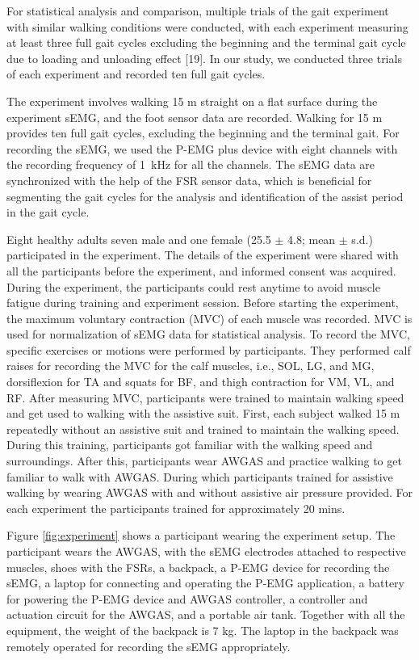 \documentclass[paper,JRM,paper]{jaciiiarticle}
\begin{document}
For statistical analysis and comparison, multiple trials of the gait experiment with similar walking conditions were conducted, with each experiment measuring at least three full gait cycles excluding the beginning and the terminal gait cycle due to loading and unloading effect [19]. In our study, we conducted three trials of each experiment and recorded ten full gait cycles. 

The experiment involves walking 15 m straight on a flat surface during the experiment sEMG, and the foot sensor data are recorded. Walking for 15 m provides ten full gait cycles, excluding the beginning and the terminal gait.  For recording the sEMG, we used the P-EMG plus device with eight channels with the recording frequency of \SI{1}{\kilo\hertz} for all the channels. The sEMG data are synchronized with the help of the FSR sensor data, which is beneficial for segmenting the gait cycles for the analysis and identification of the assist period in the gait cycle. 

Eight healthy adults seven male and one female (25.5 $\pm$ 4.8; mean $\pm$ s.d.) participated in the experiment. The details of the experiment were shared with all the participants before the experiment, and informed consent was acquired. During the experiment, the participants could rest anytime to avoid muscle fatigue during training and experiment session. Before starting the experiment, the maximum voluntary contraction (MVC) of each muscle was recorded. MVC is used for normalization of sEMG data for statistical analysis. To record the MVC, specific exercises or motions were performed by participants. They performed calf raises for recording the MVC for the calf muscles, i.e., SOL, LG, and MG, dorsiflexion for TA and squats for BF, and thigh contraction for VM, VL, and RF. 
After measuring MVC, participants were trained to maintain walking speed and get used to walking with the assistive suit. First, each subject walked 15 m repeatedly without an assistive suit and trained to maintain the walking speed. During this training, participants got familiar with the walking speed and surroundings. After this, participants wear AWGAS and practice walking to get familiar to walk with AWGAS. During which participants trained for assistive walking by wearing AWGAS with and without assistive air pressure provided. For each experiment the participants trained for approximately 20 mins. 



Figure \ref{fig:experiment} shows a participant wearing the experiment setup. The participant wears the AWGAS, with the sEMG electrodes attached to respective muscles, shoes with the FSRs, a backpack, a P-EMG device for recording the sEMG, a laptop for connecting and operating the P-EMG application, a battery for powering the P-EMG device and AWGAS controller, a controller and actuation circuit for the AWGAS, and a portable air tank. Together with all the equipment, the weight of the backpack is 7 kg. The laptop in the backpack was remotely operated for recording the sEMG appropriately.
\end{document}
